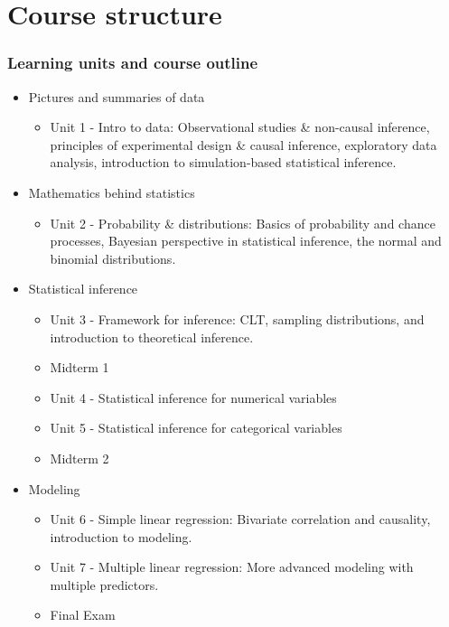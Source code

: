 \documentclass[11pt]{beamer}
\begin{document}

\section{Course structure}


\begin{frame}[shrink]
\frametitle{Learning units and course outline}

\begin{itemize}

\item Pictures and summaries of data
\begin{itemize}
\item \alert{Unit 1 - Intro to data:} Observational studies \& non-causal inference, 
principles of experimental design \& causal inference, exploratory data analysis, 
introduction to simulation-based statistical inference.
\end{itemize}

\item Mathematics behind statistics
\begin{itemize}
\item \alert{Unit 2 - Probability \& distributions:} Basics of probability and chance 
processes, Bayesian perspective in statistical inference, the normal and binomial 
distributions.
\end{itemize}

\item Statistical inference
\begin{itemize}
\item \alert{Unit 3 - Framework for inference:} CLT, sampling distributions, and 
introduction to theoretical inference.
\item Midterm 1
\item \alert{Unit 4 - Statistical inference for numerical variables}
\item \alert{Unit 5 - Statistical inference for categorical variables}
\item Midterm 2
\end{itemize}

\item Modeling
\begin{itemize}
\item \alert{Unit 6 - Simple linear regression:} Bivariate correlation and causality, 
introduction to modeling.
\item \alert{Unit 7 - Multiple linear regression:} More advanced modeling with multiple 
predictors.
\item Final Exam
\end{itemize}

\end{itemize}

\end{frame}
\end{document}
